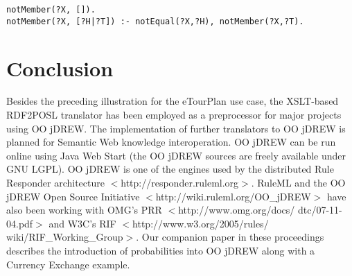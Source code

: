 \documentclass [letterpaper] {Article}
\begin{document}
\begin{small}
\begin{small}
\begin{verbatim}
notMember(?X, []). 
notMember(?X, [?H|?T]) :- notEqual(?X,?H), notMember(?X,?T).

\end{verbatim}
\end{small}



\section{Conclusion}

\hspace{0.3in}Besides the preceding illustration for the eTourPlan use case, the XSLT-based RDF2POSL translator has been employed as a preprocessor for major projects using OO jDREW.
The implementation of further translators to OO jDREW is planned for Semantic Web knowledge interoperation.
OO jDREW can be run online using Java Web Start (the OO jDREW sources are freely available under GNU LGPL).
OO jDREW is one of the engines used by the distributed
Rule Responder architecture $<$http://responder.ruleml.org$>$. RuleML and the OO jDREW Open Source Initiative \linebreak $<$http://wiki.ruleml.org/OO\_jDREW$>$ have also been working with OMG's PRR $<$http://www.omg.org/docs/
dtc/07-11-04.pdf$>$ and W3C's RIF \linebreak 
$<$http://www.w3.org/2005/rules/ wiki/RIF\_Working\_Group$>$.
Our companion paper in these proceedings describes the introduction of probabilities into OO jDREW along with a Currency Exchange example.

\nocite{*}
\newpage
\singlespacing
%
%
\end{small}
\end{document}
